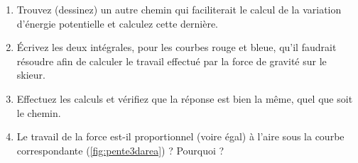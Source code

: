 \documentclass{cup-pan}
\begin{document}
\questions
\begin{enumerate}
    \item Trouvez (dessinez) un autre chemin qui faciliterait le calcul de la variation d'énergie potentielle et calculez cette dernière.
    \item Écrivez les deux intégrales, pour les courbes rouge et bleue, qu'il faudrait résoudre afin de calculer le travail effectué par la force de gravité sur le skieur.
    \item Effectuez les calculs et vérifiez que la réponse est bien la même, quel que soit le chemin.
    \item Le travail de la force est-il proportionnel (voire égal) à l'aire sous la courbe correspondante (\autoref{fig:pente3darea}) ? Pourquoi ? 
\end{enumerate}
\end{document}
